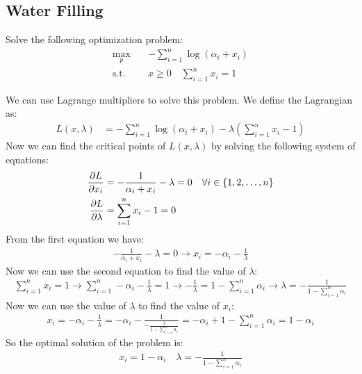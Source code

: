 \documentclass[12pt]{article}
\begin{document}
\subsection{Water Filling}
Solve the following optimization problem:
\begin{align*}
    \max_{p} \quad    & {-\sum_{i=1}^{n} \log(\alpha_i + x_i)} \\
    \text{s.t.} \quad & x \geq 0 \quad \sum_{i=1}^{n} x_i = 1
\end{align*}
\begin{qsolve}[solution]
    We can use Lagrange multipliers to solve this problem. We define the Lagrangian as:
    \begin{align*}
        L(x, \lambda) & = -\sum_{i=1}^{n} \log(\alpha_i + x_i) - \lambda \left( \sum_{i=1}^{n} x_i - 1 \right)
    \end{align*}
    Now we can find the critical points of $L(x, \lambda)$ by solving the following system of equations:
    \begin{align*}
        \pdv{L}{x_i}     & = -\frac{1}{\alpha_i + x_i} - \lambda = 0 \quad \forall i \in \{1,2,\ldots,n\} \\
        \pdv{L}{\lambda} & = \sum_{i=1}^{n} x_i - 1 = 0
    \end{align*}
    From the first equation we have:
    \begin{align*}
        -\frac{1}{\alpha_i + x_i} - \lambda = 0 \rightarrow x_i = -\alpha_i - \frac{1}{\lambda}
    \end{align*}
    Now we can use the second equation to find the value of $\lambda$:
    \begin{align*}
        \sum_{i=1}^{n} x_i = 1 \rightarrow \sum_{i=1}^{n} -\alpha_i - \frac{1}{\lambda} = 1 \rightarrow -\frac{1}{\lambda} = 1 - \sum_{i=1}^{n} \alpha_i \rightarrow \lambda = -\frac{1}{1 - \sum_{i=1}^{n} \alpha_i}
    \end{align*}
    Now we can use the value of $\lambda$ to find the value of $x_i$:
    \begin{align*}
        x_i = -\alpha_i - \frac{1}{\lambda} = -\alpha_i - \frac{1}{-\frac{1}{1 - \sum_{i=1}^{n} \alpha_i}} = -\alpha_i + 1 - \sum_{i=1}^{n} \alpha_i = 1 - \alpha_i
    \end{align*}
    So the optimal solution of the problem is:
    \begin{align*}
        x_i = 1 - \alpha_i \quad \lambda = -\frac{1}{1 - \sum_{i=1}^{n} \alpha_i}
    \end{align*}
\end{qsolve}
\end{document}
